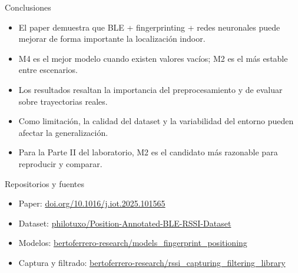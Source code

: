 \documentclass[aspectratio=169]{beamer}
\begin{document}
\begin{frame}{Conclusiones}
  \begin{itemize}
    \item El paper demuestra que BLE + fingerprinting + redes neuronales puede mejorar de forma importante la localizaci\'on indoor.
    \item M4 es el mejor modelo cuando existen valores vac\'ios; M2 es el m\'as estable entre escenarios.
    \item Los resultados resaltan la importancia del preprocesamiento y de evaluar sobre trayectorias reales.
    \item Como limitaci\'on, la calidad del dataset y la variabilidad del entorno pueden afectar la generalizaci\'on.
    \item Para la Parte II del laboratorio, M2 es el candidato m\'as razonable para reproducir y comparar.
  \end{itemize}
\end{frame}

\begin{frame}{Repositorios y fuentes}
  \small
  \begin{itemize}
    \item Paper: \href{https://doi.org/10.1016/j.iot.2025.101565}{doi.org/10.1016/j.iot.2025.101565}
    \item Dataset: \href{https://github.com/philotuxo/Position-Annotated-BLE-RSSI-Dataset}{philotuxo/Position-Annotated-BLE-RSSI-Dataset}
    \item Modelos: \href{https://github.com/bertoferrero-research/models_fingerprint_positioning}{bertoferrero-research/models\_fingerprint\_positioning}
    \item Captura y filtrado: \href{https://github.com/bertoferrero-research/rssi_capturing_filtering_library}{bertoferrero-research/rssi\_capturing\_filtering\_library}
  \end{itemize}
\end{frame}
\end{document}
